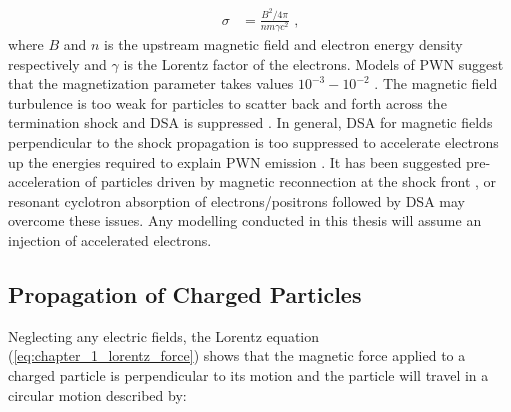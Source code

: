 \begin{equation}
    \begin{aligned}
        \sigma&=\frac{B^2/4\pi}{nm\gamma c^2}\text{ ,}
    \end{aligned}
\end{equation}
\noindent where $B$ and $n$ is the upstream magnetic field and electron energy density respectively and $\gamma$ is the Lorentz factor of the electrons. Models of PWN suggest that the magnetization parameter takes values $10^{-3}-10^{-2}$ \citep{1974MNRAS.167....1R,1984ApJ...283..694K,2004MNRAS.349..779K}. The magnetic field turbulence is too weak for particles to scatter back and forth across the termination shock and DSA is suppressed \citep{2010MNRAS.402..321L,2015SSRv..191..519S}. In general, DSA for magnetic fields perpendicular to the shock propagation is too suppressed to accelerate electrons up the energies required to explain PWN emission \citep{2003APh....19..649M, 2014ApJ...783...91C}. It has been suggested pre-acceleration of particles driven by magnetic reconnection at the shock front \citep{2001ApJ...547..437L,2003MNRAS.345..153L,2016JPlPh..82d6301L}, or resonant cyclotron absorption of electrons/positrons \cite{2001ApJ...547..437L}  followed by DSA may overcome these issues.
\newpar
Any modelling conducted in this thesis will assume an injection of accelerated electrons.

\subsection{Propagation of Charged Particles} \label{chapter_1_cr_propagation}

Neglecting any electric fields, the Lorentz equation (\autoref{eq:chapter_1_lorentz_force}) shows that the magnetic force applied to a charged particle is perpendicular to its motion and the particle will travel in a circular motion described by:

